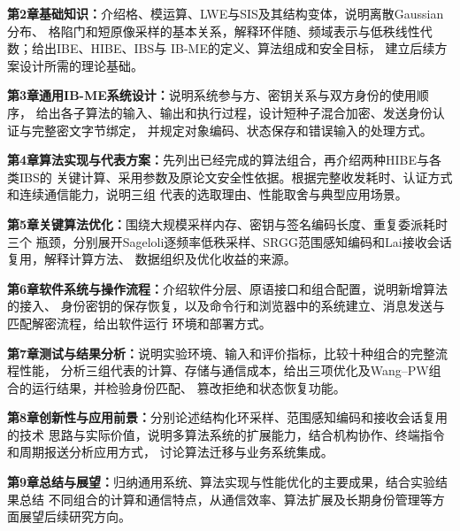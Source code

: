 \textbf{第2章\quad 基础知识：}介绍格、模运算、LWE与SIS及其结构变体，说明离散Gaussian分布、
格陷门和短原像采样的基本关系，解释环伴随、频域表示与低秩线性代数；给出IBE、HIBE、IBS与
IB-ME的定义、算法组成和安全目标，
建立后续方案设计所需的理论基础。

\textbf{第3章\quad 通用IB-ME系统设计：}说明系统参与方、密钥关系与双方身份的使用顺序，
给出各子算法的输入、输出和执行过程，设计短种子混合加密、发送身份认证与完整密文字节绑定，
并规定对象编码、状态保存和错误输入的处理方式。

\textbf{第4章\quad 算法实现与代表方案：}先列出已经完成的算法组合，再介绍两种HIBE与各类IBS的
关键计算、采用参数及原论文安全性依据。根据完整收发耗时、认证方式和连续通信能力，说明三组
代表的选取理由、性能取舍与典型应用场景。

\textbf{第5章\quad 关键算法优化：}围绕大规模采样内存、密钥与签名编码长度、重复委派耗时三个
瓶颈，分别展开Sageloli逐频率低秩采样、SRGG范围感知编码和Lai接收会话复用，解释计算方法、
数据组织及优化收益的来源。

\textbf{第6章\quad 软件系统与操作流程：}介绍软件分层、原语接口和组合配置，说明新增算法的接入、
身份密钥的保存恢复，以及命令行和浏览器中的系统建立、消息发送与匹配解密流程，给出软件运行
环境和部署方式。

\textbf{第7章\quad 测试与结果分析：}说明实验环境、输入和评价指标，比较十种组合的完整流程性能，
分析三组代表的计算、存储与通信成本，给出三项优化及Wang--PW组合的运行结果，并检验身份匹配、
篡改拒绝和状态恢复功能。

\textbf{第8章\quad 创新性与应用前景：}分别论述结构化环采样、范围感知编码和接收会话复用的技术
思路与实际价值，说明多算法系统的扩展能力，结合机构协作、终端指令和周期报送分析应用方式，
讨论算法迁移与业务系统集成。

\textbf{第9章\quad 总结与展望：}归纳通用系统、算法实现与性能优化的主要成果，结合实验结果总结
不同组合的计算和通信特点，从通信效率、算法扩展及长期身份管理等方面展望后续研究方向。
